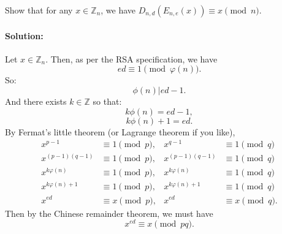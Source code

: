 \documentclass{article}
\begin{document}
\begin{exe}
    Show that for any $x\in \mathbb{Z}_n$, we have $D_{n,d}(E_{n,e}(x)) \equiv  x\pmod{n}$.\end{exe}
\paragraph{Solution: }
Let $x\in \mathbb{Z}_n$. Then, as per the RSA specification, we have
\[
ed\equiv 1\pmod{\varphi(n)} 
.\] 
So:
\[
\phi(n)|ed-1
.\] 
And there exists $k\in \mathbb{Z}$ so that:
\[
k\phi(n)=ed-1
,\] 
\[
k\phi(n)+1=ed
.\] 
By Fermat's little theorem (or Lagrange theorem if you like),
\begin{align*}
    x^{p-1}&\equiv 1\pmod{p} ,&
    x^{q-1}&\equiv 1\pmod{q} \\
    x^{(p-1)(q-1)}&\equiv 1\pmod{p} ,&
    x^{(p-1)(q-1)}&\equiv 1\pmod{q} \\
    x^{k\varphi(n)}&\equiv 1\pmod{p} ,&
    x^{k\varphi(n)}&\equiv 1\pmod{q} \\
    x^{k\varphi(n)+1}&\equiv 1\pmod{p} ,&
    x^{k\varphi(n)+1}&\equiv 1\pmod{q} \\
    x^{ed}&\equiv x\pmod{p} ,&
    x^{ed}&\equiv x\pmod{q} 
.\end{align*}
Then by the Chinese remainder theorem, we must have
\[
x^{ed}\equiv x\pmod{pq} 
.\] 
\end{document}
